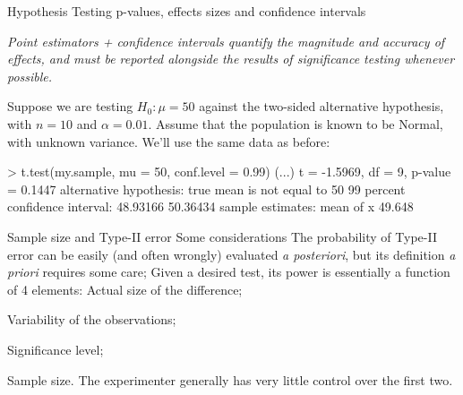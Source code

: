\documentclass[t]{beamer}
\begin{document}

\begin{ftstf}
{Hypothesis Testing}
{p-values, effects sizes and confidence intervals}
\begin{block}{}
\centering\textit{Point estimators + confidence intervals quantify the magnitude and accuracy of effects, and must be reported alongside the results of significance testing whenever possible.}
\end{block}
\vhalf
Suppose we are testing $H_0: \mu=50$ against the two-sided alternative hypothesis, with $n=10$ and $\alpha=0.01$. Assume that the population is known to be Normal, with unknown variance. We'll use the same data as before:
\vhalf
\begin{rcode}
> t.test(my.sample, mu = 50, conf.level = 0.99)
(...)
t = -1.5969, df = 9, p-value = 0.1447
alternative hypothesis: true mean is not equal to 50
99 percent confidence interval:
 48.93166 50.36434
sample estimates:
mean of x 
   49.648 
\end{rcode}
\end{ftstf}


\begin{ftst}{Sample size and Type-II error}
{Some considerations}
The probability of Type-II error can be easily (and often wrongly) evaluated \textit{a posteriori}, but its definition \textit{a priori} requires some care;
\vone
Given a desired test, its power is essentially a function of 4 elements:
\bitems Actual size of the difference;
	\item Variability of the observations;
	\item Significance level;
	\item Sample size.
\eitem
\vone
The experimenter generally has very little control over the first two.
\end{ftst}

\end{document}
